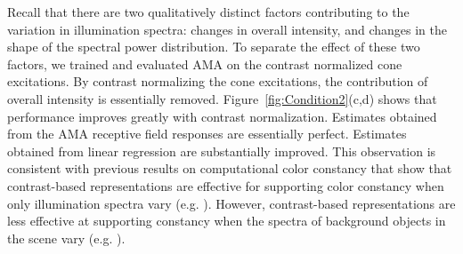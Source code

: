 \documentclass{jov}
\begin{document}
Recall that there are two qualitatively distinct factors contributing to the variation in illumination spectra: changes in overall intensity, and changes in the shape of the spectral power distribution. 
To separate the effect of these two factors, we trained and evaluated AMA on the contrast normalized cone excitations. 
By contrast normalizing the cone excitations, the contribution of overall intensity is essentially removed.
Figure~\ref{fig:Condition2}(c,d) shows that performance improves greatly with contrast normalization. 
Estimates obtained from the AMA receptive field responses are essentially perfect. 
Estimates obtained from linear regression are substantially improved.
This observation is consistent with previous results on computational color constancy that show that 
contrast-based representations are effective for supporting color constancy when only illumination spectra vary (e.g. ).
However, contrast-based representations are less effective at supporting constancy when the spectra of background objects in the scene vary (e.g. ).
\end{document}
